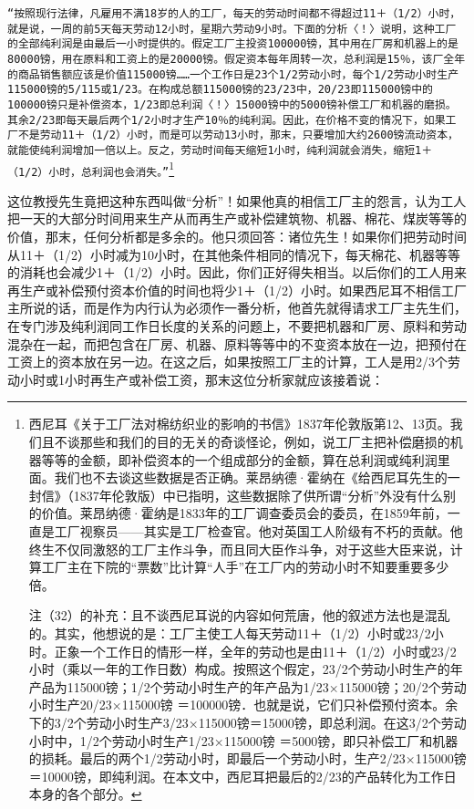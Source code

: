 \documentclass{ctexbook}
\begin{document}
    \texttt{“按照现行法律，凡雇用不满18岁的人的工厂，每天的劳动时间都不得超过11＋（1/2）小时，就是说，一周的前5天每天劳动12小时，星期六劳动9小时。下面的分析〈！〉说明，这种工厂的全部纯利润是由最后一小时提供的。假定工厂主投资100000镑，其中用在厂房和机器上的是80000镑，用在原料和工资上的是20000镑。假定资本每年周转一次，总利润是15％，该厂全年的商品销售额应该是价值115000镑……一个工作日是23个1/2劳动小时，每个1/2劳动小时生产115000镑的5/115或1/23。在构成总额115000镑的23/23中，20/23即115000镑中的100000镑只是补偿资本，1/23即总利润〈！〉15000镑中的5000镑补偿工厂和机器的磨损。其余2/23即每天最后两个1/2小时才生产10％的纯利润。因此，在价格不变的情况下，如果工厂不是劳动11＋（1/2）小时，而是可以劳动13小时，那末，只要增加大约2600镑流动资本，就能使纯利润增加一倍以上。反之，劳动时间每天缩短1小时，纯利润就会消失，缩短1＋（1/2）小时，总利润也会消失。”}\footnote{西尼耳《关于工厂法对棉纺织业的影响的书信》1837年伦敦版第12、13页。我们且不谈那些和我们的目的无关的奇谈怪论，例如，说工厂主把补偿磨损的机器等等的金额，即补偿资本的一个组成部分的金额，算在总利润或纯利润里面。我们也不去谈这些数据是否正确。莱昂纳德·霍纳在《给西尼耳先生的一封信》（1837年伦敦版）中已指明，这些数据除了供所谓“分析”外没有什么别的价值。莱昂纳德·霍纳是1833年的工厂调查委员会的委员，在1859年前，一直是工厂视察员——其实是工厂检查官。他对英国工人阶级有不朽的贡献。他终生不仅同激怒的工厂主作斗争，而且同大臣作斗争，对于这些大臣来说，计算工厂主在下院的“票数”比计算“人手”在工厂内的劳动小时不知要重要多少倍。

    注（32）的补充：且不谈西尼耳说的内容如何荒唐，他的叙述方法也是混乱的。其实，他想说的是：工厂主使工人每天劳动11＋（1/2）小时或23/2小时。正象一个工作日的情形一样，全年的劳动也是由11＋（1/2）小时或23/2小时（乘以一年的工作日数）构成。按照这个假定，23/2个劳动小时生产的年产品为115000镑；1/2个劳动小时生产的年产品为1/23×115000镑；20/2个劳动小时生产20/23×115000镑 ＝100000镑．也就是说，它们只补偿预付资本。余下的3/2个劳动小时生产3/23×115000镑＝15000镑，即总利润。在这3/2个劳动小时中，1/2个劳动小时生产1/23×115000镑 ＝5000镑，即只补偿工厂和机器的损耗。最后的两个1/2劳动小时，即最后一个劳动小时，生产2/23×115000镑＝10000镑，即纯利润。在本文中，西尼耳把最后的2/23的产品转化为工作日本身的各个部分。}
    

    这位教授先生竟把这种东西叫做“分析”！如果他真的相信工厂主的怨言，认为工人把一天的大部分时间用来生产从而再生产或补偿建筑物、机器、棉花、煤炭等等的价值，那末，任何分析都是多余的。他只须回答：诸位先生！如果你们把劳动时间从11＋（1/2）小时减为10小时，在其他条件相同的情况下，每天棉花、机器等等的消耗也会减少1＋（1/2）小时。因此，你们正好得失相当。以后你们的工人用来再生产或补偿预付资本价值的时间也将少1＋（1/2）小时。如果西尼耳不相信工厂主所说的话，而是作为内行认为必须作一番分析，他首先就得请求工厂主先生们，在专门涉及纯利润同工作日长度的关系的问题上，不要把机器和厂房、原料和劳动混杂在一起，而把包含在厂房、机器、原料等等中的不变资本放在一边，把预付在工资上的资本放在另一边。在这之后，如果按照工厂主的计算，工人是用2/3个劳动小时或1小时再生产或补偿工资，那末这位分析家就应该接着说：
\end{document}
